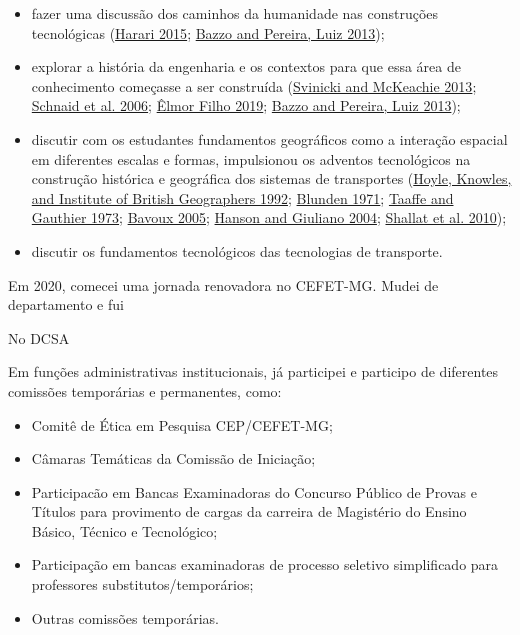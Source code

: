 \documentclass[
]{book}
\begin{document}
\begin{itemize}
\item
  fazer uma discussão dos caminhos da humanidade nas construções
  tecnológicas (\protect\hyperlink{ref-harari2015a}{Harari 2015};
  \protect\hyperlink{ref-bazzo2013}{Bazzo and Pereira, Luiz 2013});
\item
  explorar a história da engenharia e os contextos para que essa área de
  conhecimento começasse a ser construída
  (\protect\hyperlink{ref-svinicki2013}{Svinicki and McKeachie 2013};
  \protect\hyperlink{ref-ensinod2006}{Schnaid et al. 2006};
  \protect\hyperlink{ref-uxealmorfilho2019}{Êlmor Filho 2019};
  \protect\hyperlink{ref-bazzo2013}{Bazzo and Pereira, Luiz 2013});
\item
  discutir com os estudantes fundamentos geográficos como a interação
  espacial em diferentes escalas e formas, impulsionou os adventos
  tecnológicos na construção histórica e geográfica dos sistemas de
  transportes (\protect\hyperlink{ref-modernt1992}{Hoyle, Knowles, and
  Institute of British Geographers 1992};
  \protect\hyperlink{ref-blunden1971}{Blunden 1971};
  \protect\hyperlink{ref-taaffe1973}{Taaffe and Gauthier 1973};
  \protect\hyperlink{ref-bavoux2005}{Bavoux 2005};
  \protect\hyperlink{ref-thegeog2004}{Hanson and Giuliano 2004};
  \protect\hyperlink{ref-shallat2010}{Shallat et al. 2010});
\item
  discutir os fundamentos tecnológicos das tecnologias de transporte.
\end{itemize}

Em 2020, comecei uma jornada renovadora no CEFET-MG. Mudei de
departamento e fui

No DCSA

Em funções administrativas institucionais, já participei e participo de
diferentes comissões temporárias e permanentes, como:

\begin{itemize}
\item
  Comitê de Ética em Pesquisa CEP/CEFET-MG;
\item
  Câmaras Temáticas da Comissão de Iniciação;
\item
  Participacão em Bancas Examinadoras do Concurso Público de Provas e
  Títulos para provimento de cargas da carreira de Magistério do Ensino
  Básico, Técnico e Tecnológico;
\item
  Participação em bancas examinadoras de processo seletivo simplificado
  para professores substitutos/temporários;
\item
  Outras comissões temporárias.
\end{itemize}
\end{document}

